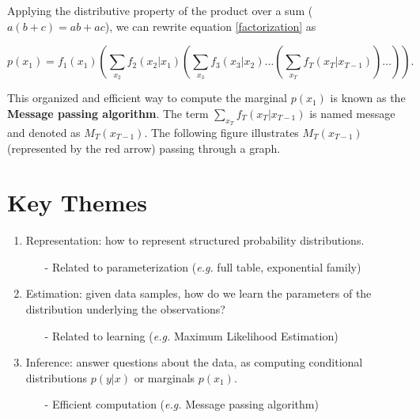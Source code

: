 \documentclass[12pt]{report}
\begin{document}
\noindent Applying the distributive property of the product over a sum ($a(b+c) = ab + ac$), we can rewrite equation \ref{factorization} as

\begin{equation}
p(x_1) = f_1(x_1) \left( \sum_{x_2}f_2(x_2|x_1) \left( \sum_{x_3} f_3(x_3|x_2) \ldots \left( \sum_{x_T} f_T(x_T|x_{T-1}) \right) \ldots \right) \right).
\end{equation}

\noindent This organized and efficient way to compute the marginal $p(x_1)$ is known as the \textbf{Message passing algorithm}. The term $\displaystyle\sum_{x_T} f_T(x_T|x_{T-1})$ is named message and denoted as $M_{T}(x_{T-1})$. The following figure illustrates $M_{T}(x_{T-1})$ (represented by the red arrow) passing through a graph.

\begin{center}
\end{center}

\section{Key Themes}
\begin{enumerate}
\item Representation: how to represent structured probability distributions.
\begin{itemize}
\item[-] Related to parameterization (\textit{e.g.} full table, exponential family) 
\end{itemize}
\item Estimation: given data samples, how do we learn the parameters of the distribution underlying the observations?
\begin{itemize}
\item[-] Related to learning (\textit{e.g.} Maximum Likelihood Estimation) 
\end{itemize}
\item Inference: answer questions about the data, as computing conditional distributions $p(y|x)$ or marginals $p(x_1)$.
\begin{itemize}
\item[-] Efficient computation (\textit{e.g.} Message passing algorithm) 
\end{itemize}
\end{enumerate}
\end{document}
